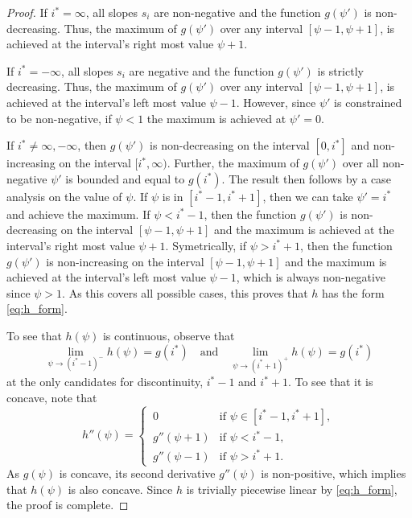 \documentclass[10pt]{article}
\begin{document}
\hform*
\begin{proof}
    If $i^* = \infty$, all slopes $s_i$ are non-negative and the function $g(\psi')$ is non-decreasing.
    Thus, the maximum of $g(\psi')$ over any interval $[\psi - 1, \psi + 1]$, is achieved at the interval's right
    most value $\psi + 1$. 

    If $i^* = -\infty$, all slopes $s_i$ are negative and the function $g(\psi')$ is strictly decreasing. 
    Thus, the maximum of $g(\psi')$ over any interval $[\psi - 1, \psi + 1]$, is achieved at the interval's left
    most value $\psi - 1$. However, since $\psi'$ is constrained to be non-negative, if $\psi < 1$ the maximum
    is achieved at $\psi' = 0$.

    If $i^* \neq \infty, -\infty$, then $g(\psi')$ is non-decreasing on the interval $[0, i^*]$ and non-increasing
    on the interval $[i^*, \infty)$. Further, the maximum of $g(\psi')$ over all non-negative $\psi'$ is bounded
    and equal to $g(i^*)$. The result then follows by a case analysis on the value of $\psi$. If $\psi$ is in $[i^* - 1, i^* + 1]$, then
    we can take $\psi' = i^*$ and achieve the maximum. If $\psi < i^* - 1$, then the function $g(\psi')$ is non-decreasing 
    on the interval $[\psi - 1, \psi + 1]$ and the maximum is achieved at the interval's right most value $\psi + 1$. 
    Symetrically, if $\psi > i^* + 1$, then the function $g(\psi')$ is non-increasing on the interval $[\psi - 1, \psi + 1]$ and the 
    maximum is achieved at the interval's left most value $\psi - 1$, which is always non-negative since $\psi > 1$. 
    As this covers all possible cases, this proves that $h$ has the form \eqref{eq:h_form}.

    To see that $h(\psi)$ is continuous, observe that
    \[\lim_{\psi \to (i^* - 1)^-} h(\psi) = g(i^*) \quad\text{and}\quad \lim_{\psi \to (i^* + 1)^+} h(\psi) = g(i^*)\]
    at the only candidates for discontinuity, $i^* - 1$ and $i^* + 1$. To see that it is concave, note that
    \[h''(\psi) = \begin{cases}
        \,0 &\text{if } \psi \in [i^* - 1, i^* + 1],\\
        \,g''(\psi + 1) &\text{if } \psi < i^* - 1,\\
        \,g''(\psi - 1) &\text{if } \psi > i^* + 1.
    \end{cases}\]
    As $g(\psi)$ is concave, its second derivative $g''(\psi)$ is non-positive, which implies that $h(\psi)$ is also concave. Since $h$ is trivially
    piecewise linear by \eqref{eq:h_form}, the proof is complete.
\end{proof}
\end{document}
